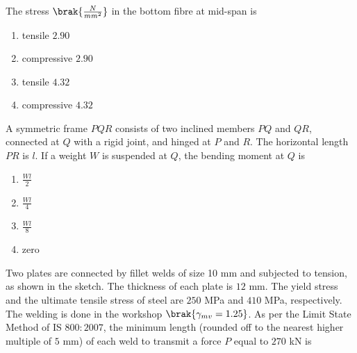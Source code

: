 The stress $\brak{\frac{N}{mm^2}}$ in the bottom fibre at mid-span is
\begin{enumerate}
    \item tensile $2.90$
    \item compressive $2.90$
    \item tensile $4.32$
    \item compressive $4.32$\\
\end{enumerate}
\item A symmetric frame $PQR$ consists of two inclined members $PQ$ and $QR$, connected at $Q$ with a rigid joint, and hinged at $P$ and $R$. The horizontal length $PR$ is $l$. If a weight $W$ is suspended at $Q$, the bending moment at $Q$ is
\begin{multicols}{4}
    \begin{enumerate}
        \item $\frac{Wl}{2}$
         \item $\frac{Wl}{4}$
          \item $\frac{Wl}{8}$
          \item zero
    \end{enumerate}
\end{multicols}
\item Two plates are connected by fillet welds of size 10 mm and subjected to tension, as shown in the sketch. The thickness of each plate is $12$ mm. The yield stress and the ultimate tensile stress of steel are $250$ MPa and $410$ MPa, respectively. The welding is done in the workshop $\brak{\gamma_{mv} = 1.25}$. As per the Limit State Method of IS $800\colon2007$, the minimum length (rounded off to the nearest higher multiple of $5$ mm) of each weld to transmit a force $P$ equal to $270$ kN is
